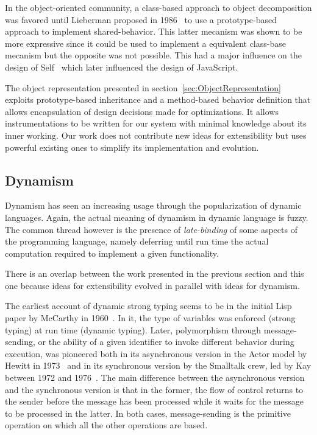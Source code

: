 In the object-oriented community, a class-based approach to object
decomposition was favored until Lieberman proposed in
1986~\cite{Lieberman:1986} to use a prototype-based approach to implement
shared-behavior. This latter mecanism was shown to be more expressive since it
could be used to implement a equivalent class-base mecanism but the opposite
was not possible. This had a major influence on the design of
Self~\cite{Ungar:1987} which later influenced the design of JavaScript.

The object representation presented in section~\ref{sec:ObjectRepresentation}
exploits prototype-based inheritance and a method-based behavior definition
that allows encapsulation of design decisions made for optimizations. It allows
instrumentations to be written for our system with minimal knowledge about its
inner working. Our work does not contribute new ideas for extensibility but
uses powerful existing ones to simplify its implementation and evolution.

\subsection{Dynamism}

Dynamism has seen an increasing usage through the popularization of dynamic
languages. Again, the actual meaning of dynamism in dynamic language is
fuzzy. The common thread however is the presence of \textit{late-binding} of
some aspects of the programming language, namely deferring until run time the
actual computation required to implement a given functionality.

There is an overlap between the work presented in the previous section and this
one because ideas for extensibility evolved in parallel with ideas for
dynamism.

The earliest account of dynamic strong typing seems to be in the initial Lisp
paper by McCarthy in 1960~\cite{McCarthy:1960}. In it, the type of variables
was enforced (strong typing) at run time (dynamic typing). Later, polymorphism
through message-sending, or the ability of a given identifier to invoke
different behavior during execution, was pioneered both in its asynchronous
version in the Actor model by Hewitt in 1973~\cite{Hewitt:1973} and in its
synchronous version by the Smalltalk crew, led by Kay between 1972 and
1976~\cite{Kay:1993}. The main difference between the asynchronous version and
the synchronous version is that in the former, the flow of control returns to
the sender before the message has been processed while it waits for the message
to be processed in the latter. In both cases, message-sending is the primitive
operation on which all the other operations are based.

